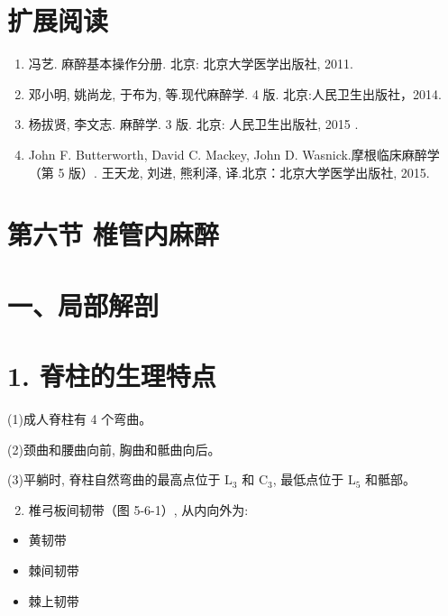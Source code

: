 \documentclass[10pt]{article}
\begin{document}
\section*{扩展阅读}
\begin{enumerate}
  \item 冯艺. 麻醉基本操作分册. 北京: 北京大学医学出版社, 2011.

  \item 邓小明, 姚尚龙, 于布为, 等.现代麻醉学. 4 版. 北京:人民卫生出版社，2014.

  \item 杨拔贤, 李文志. 麻醉学. 3 版. 北京: 人民卫生出版社, 2015 .

  \item John F. Butterworth, David C. Mackey, John D. Wasnick.摩根临床麻醉学（第 5 版）. 王天龙, 刘进, 熊利泽, 译.北京：北京大学医学出版社, 2015.

\end{enumerate}

\section*{第六节 椎管内麻醉}
\section*{一、局部解剖}
\section*{1. 脊柱的生理特点}
(1)成人脊柱有 4 个弯曲。

(2)颈曲和腰曲向前, 胸曲和骶曲向后。

(3)平躺时, 脊柱自然弯曲的最高点位于 $\mathrm{L}_{3}$ 和 $\mathrm{C}_{3}$, 最低点位于 $\mathrm{L}_{5}$ 和骶部。

\begin{enumerate}
  \setcounter{enumi}{1}
  \item 椎弓板间韧带（图 5-6-1）, 从内向外为:
\end{enumerate}

\begin{itemize}
  \item 黄韧带
  \item 棘间韧带
  \item 棘上韧带
\end{itemize}
\end{document}
